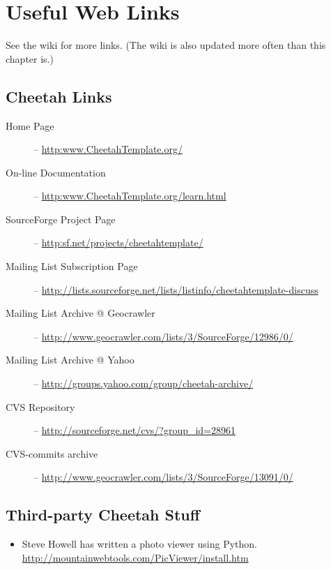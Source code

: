 \section{Useful Web Links}
\label{links}

See the wiki for more links.  (The wiki is also updated more often than this
chapter is.)

\subsection{Cheetah Links}
\label{links.cheetah}

\begin{description}
\item[Home Page] -- \url{http:www.CheetahTemplate.org/}
     
\item[On-line Documentation] -- \url{http:www.CheetahTemplate.org/learn.html}
     
\item[SourceForge Project Page] -- \url{http:sf.net/projects/cheetahtemplate/}
     
\item[Mailing List Subscription Page] --
     \url{http://lists.sourceforge.net/lists/listinfo/cheetahtemplate-discuss}
     
\item[Mailing List Archive @ Geocrawler] --
     \url{http://www.geocrawler.com/lists/3/SourceForge/12986/0/}

\item[Mailing List Archive @ Yahoo] --
     \url{http://groups.yahoo.com/group/cheetah-archive/}
    
\item[CVS Repository] -- \url{http://sourceforge.net/cvs/?group\_id=28961}
     
\item[CVS-commits archive] --
     \url{http://www.geocrawler.com/lists/3/SourceForge/13091/0/}

\end{description}

\subsection{Third-party Cheetah Stuff}
\label{links.thirdParty}

\begin{itemize}
\item Steve Howell has written a photo viewer using Python.
     \url{http://mountainwebtools.com/PicViewer/install.htm}
\end{itemize}


